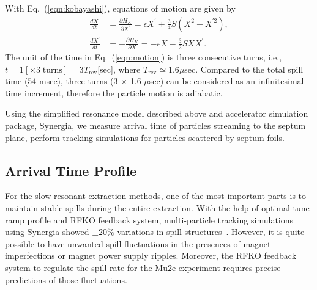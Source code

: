 \documentclass[aps,prstab,onecolumn,preprint,endfloats,11pt]{revtex4-1}
\begin{document}
With Eq.~(\ref{eqn:kobayashi}), equations of motion are given by
\begin{equation}
 \begin{split}
  \frac{dX}{dt} & = \frac{\partial H_{K}}{\partial X^{\prime}}
                  = \epsilon X^{\prime} + \frac{3}{4} S
                    \left(
                      X^{2} - X^{\prime 2}
                    \right), \\
  \frac{dX^{\prime}}{dt} & = - \frac{\partial H_{K}}{\partial X}
                           = - \epsilon X - \frac{3}{2} S X X^{\prime}.
 \end{split}
\label{eqn:motion}
\end{equation}
The unit of the time in Eq.~(\ref{eqn:motion}) is three consecutive turns, i.e., $t = 1 [\times 3 \; \text{turns}] = 3 T_{\text{rev}}$[sec], where $T_{\text{rev}} \simeq 1.6 \mu$sec.
Compared to the total spill time (54 msec), three turns (3 $\times$ 1.6 $\mu$sec) can be considered as an infinitesimal time increment, therefore the particle motion is adiabatic. 

Using the simplified resonance model described above and accelerator simulation package, Synergia, we measure arrival time of particles streaming to the septum plane, perform tracking simulations for particles scattered by septum foils.


\subsection{\label{sec:arrival}Arrival Time Profile}

For the slow resonant extraction methods, one of the most important parts is to maintain stable spills during the entire extraction. With the help of optimal tune-ramp profile and RFKO feedback system, multi-particle tracking simulations using Synergia showed \mbox{$\pm 20\%$} variations in spill structures~\cite{mu2e}. However, it is quite possible to have unwanted spill fluctuations in the presences of magnet imperfections or magnet power supply ripples. Moreover, the RFKO feedback system to regulate the spill rate for the Mu2e experiment requires precise predictions of those fluctuations. 
\end{document}
